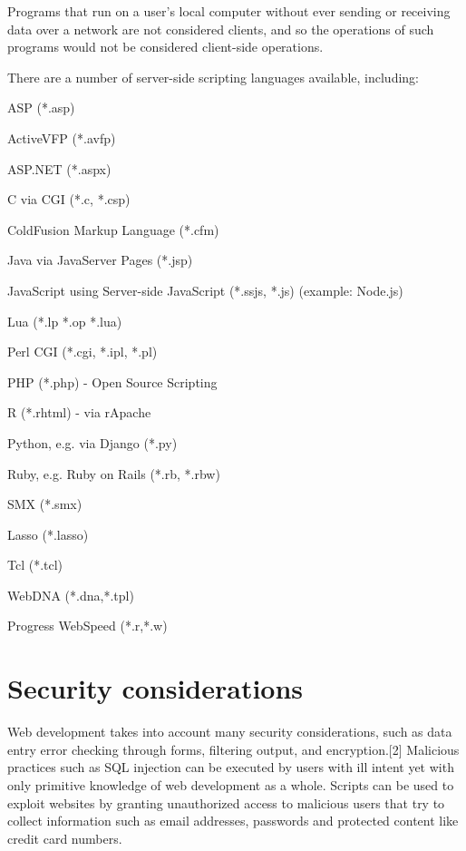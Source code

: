 Programs that run on a user's local computer without ever sending or receiving data over a network are not considered clients, and so the operations of such programs would not be considered client-side operations.

There are a number of server-side scripting languages available, including:

\begin{compactitem}
\item ASP (*.asp)
\item ActiveVFP (*.avfp)
\item ASP.NET (*.aspx)
\item C via CGI (*.c, *.csp)
\item ColdFusion Markup Language (*.cfm)
\item Java via JavaServer Pages (*.jsp)
\item JavaScript using Server-side JavaScript (*.ssjs, *.js) (example: Node.js)
\item Lua (*.lp *.op *.lua)
\item Perl CGI (*.cgi, *.ipl, *.pl)
\item PHP (*.php) - Open Source Scripting
\item R (*.rhtml) - via rApache
\item Python, e.g. via Django (*.py)
\item Ruby, e.g. Ruby on Rails (*.rb, *.rbw)
\item SMX (*.smx)
\item Lasso (*.lasso)
\item Tcl (*.tcl)
\item WebDNA (*.dna,*.tpl)
\item Progress WebSpeed (*.r,*.w)
\end{compactitem}



\section{Security considerations}


Web development takes into account many security considerations, such as data entry error checking through forms, filtering output, and encryption.[2] Malicious practices such as SQL injection can be executed by users with ill intent yet with only primitive knowledge of web development as a whole. Scripts can be used to exploit websites by granting unauthorized access to malicious users that try to collect information such as email addresses, passwords and protected content like credit card numbers.

